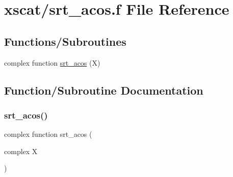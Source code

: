 \hypertarget{xscat_2srt__acos_8f}{}\section{xscat/srt\+\_\+acos.f File Reference}
\label{xscat_2srt__acos_8f}
\subsection*{Functions/\+Subroutines}
\begin{DoxyCompactItemize}
\item 
complex function \hyperlink{xscat_2srt__acos_8f_ab47c705e50e0b0220fb2d72a876859df}{srt\+\_\+acos} (X)
\end{DoxyCompactItemize}


\subsection{Function/\+Subroutine Documentation}
\mbox{\label{xscat_2srt__acos_8f_ab47c705e50e0b0220fb2d72a876859df}} 
\subsubsection{\texorpdfstring{srt\+\_\+acos()}{srt\_acos()}}
{\footnotesize\ttfamily complex function srt\+\_\+acos (\begin{DoxyParamCaption}\item[{complex}]{X }\end{DoxyParamCaption})}

